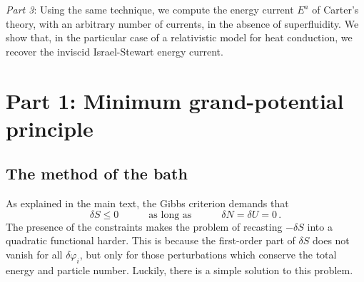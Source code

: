\documentclass[a4paper, amsfonts, amssymb, amsmath, reprint, showkeys, nofootinbib, twoside, onecolumn,notitlepage]{revtex4-1}
\newcommand{\spc}{\quad \quad \quad}
\begin{document}
\textit{Part 3}: Using the same technique, we compute the energy current $E^a$ of Carter's theory, with an arbitrary number of currents, in the absence of superfluidity. We show that, in the particular case of a relativistic model for heat conduction, we recover the inviscid Israel-Stewart energy current. 


\newpage


\section*{Part 1: Minimum grand-potential principle}


\subsection{The method of the bath}

As explained in the main text, the Gibbs criterion demands that
\begin{equation}\label{gubbosos}
\delta S \leq 0 \spc \text{as long as} \spc \delta N = \delta U =0 \, .
\end{equation}
The presence of the constraints makes the problem of recasting $-\delta S$ into a quadratic functional harder. This is because the first-order part of $\delta S$ does not vanish for all $\delta \varphi_i$, but only for those perturbations which conserve the total energy and particle number. Luckily, there is a simple solution to this problem. 
\end{document}
